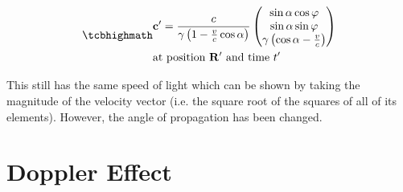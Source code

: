 
\begin{equation}
	\label{eq: velocity transform for light}
	\mhl{
		\begin{aligned}
			 & \mathbf{c}{'} = \dfrac{c}{{\gamma}\left(1- \frac{v}{c} \cos\alpha\right) }
			\begin{pmatrix}
				\sin\alpha\cos\varphi                            \\
				\sin\alpha\sin\varphi                            \\
				{\gamma} \left( \cos\alpha - \frac{v}{c} \right) \\
			\end{pmatrix}
			\\
			 & \text{at position $\mathbf{R}{'}$ and time $t{'}$ }
		\end{aligned}
	}
\end{equation}

This still has the same speed of light which can be shown by taking the magnitude of the velocity vector (i.e. the square root of the squares of all of its elements). However, the angle of propagation has been changed.

\section{Doppler Effect}

